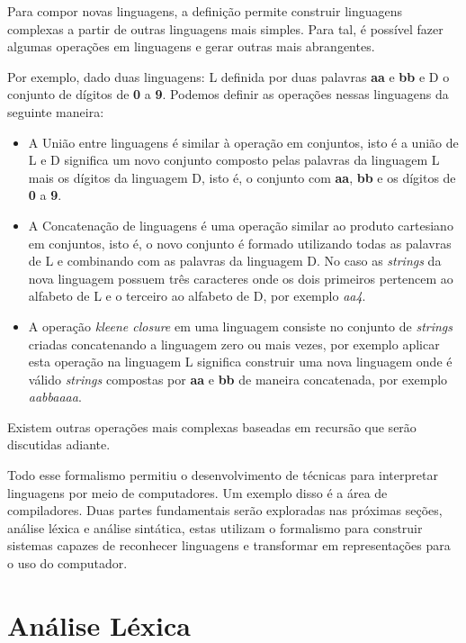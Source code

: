 Para compor novas linguagens, a definição permite construir linguagens complexas a partir de
outras linguagens mais simples. Para tal, é possível fazer algumas operações em linguagens
e gerar outras mais abrangentes.

Por exemplo, dado duas linguagens: L definida por duas palavras \textbf{aa} e \textbf{bb} e
D o conjunto de dígitos de \textbf{0} a \textbf{9}. Podemos definir as operações nessas 
linguagens da seguinte maneira:

\begin{itemize} 
    \item A União entre linguagens é similar à operação em conjuntos, isto é a união de L e D significa
    um novo conjunto composto pelas palavras da linguagem L mais os dígitos da linguagem D, isto é,
    o conjunto com \textbf{aa}, \textbf{bb} e os dígitos de \textbf{0} a \textbf{9}.
    \item A Concatenação de linguagens é uma operação similar ao produto cartesiano em conjuntos,
    isto é, o novo conjunto é formado utilizando todas as palavras de L e combinando com as
    palavras da linguagem D. No caso as \textit{strings} da nova linguagem possuem três caracteres
    onde os dois primeiros pertencem ao alfabeto de L e o terceiro ao alfabeto de D, por exemplo
    \textit{aa4}.
    \item A operação \textit{kleene closure} em uma linguagem consiste no conjunto de \textit{strings} criadas 
    concatenando a linguagem zero ou mais vezes, por exemplo aplicar esta operação na 
    linguagem L significa construir uma nova linguagem onde é válido \textit{strings} compostas por
    \textbf{aa} e \textbf{bb} de maneira concatenada, por exemplo \textit{aabbaaaa}.
\end{itemize}

Existem outras operações mais complexas baseadas em recursão que serão discutidas adiante.

Todo esse formalismo permitiu o desenvolvimento de técnicas para interpretar linguagens por meio de computadores.
Um exemplo disso é a área de compiladores. Duas partes fundamentais serão exploradas nas próximas
seções, análise léxica e análise sintática, estas utilizam o formalismo para construir sistemas capazes 
de reconhecer linguagens e transformar em representações para o uso do computador.

\section{Análise Léxica}

